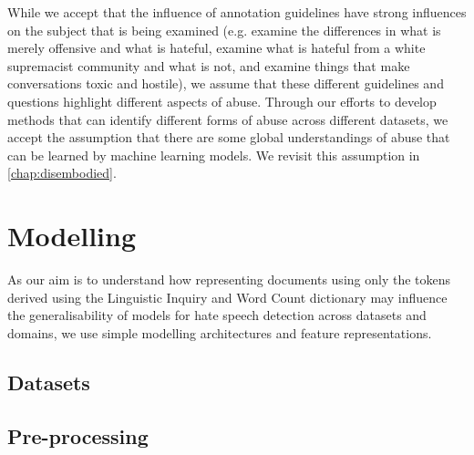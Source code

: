 While we accept that the influence of annotation guidelines have strong influences on the subject that is being examined (e.g. \citet{Davidson:2017} examine the differences in what is merely offensive and what is hateful, \citet{Garcia:2019} examine what is hateful from a white supremacist community and what is not, and \citet{Wulczyn:2017} examine things that make conversations toxic and hostile), we assume that these different guidelines and questions highlight different aspects of abuse. Through our efforts to develop methods that can identify different forms of abuse across different datasets, we accept the assumption that there are some global understandings of abuse that can be learned by machine learning models. We revisit this assumption in \autoref{chap:disembodied}.

\section{Modelling}
As our aim is to understand how representing documents using only the tokens derived using the Linguistic Inquiry and Word Count dictionary may influence the generalisability of models for hate speech detection across datasets and domains, we use simple modelling architectures and feature representations.

\subsection{Datasets}

\subsection{Pre-processing}


\begin{table}
  \centering
  \caption{Word token and BPE representation.}
  \label{tab:bpe_tok}
\end{table}

